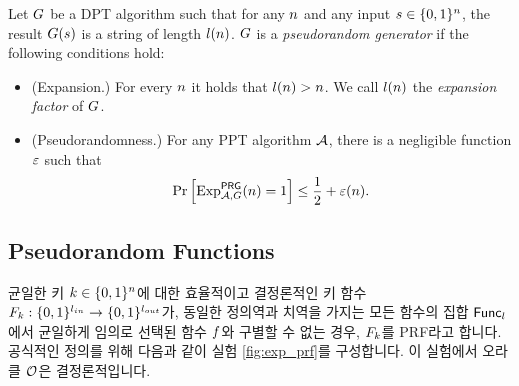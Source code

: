 \begin{definition} 
  Let $G$ be a DPT algorithm such that for any $n$ and any input $s \in
  \{0, 1\}^{n}$, the result $G(s)$ is a string of length $l(n)$. $G$ is a
  \emph{pseudorandom generator} if the following conditions hold:
  \begin{itemize}
      \item (Expansion.) For every $n$ it holds that $l(n) > n$. We call $l(n)$ the \emph{expansion factor} of $G$.
      \item (Pseudorandomness.) For any PPT algorithm $\mathcal{A}$, there is a negligible function $\varepsilon$ such that
            \begin{equation}
                \text{Pr} \left[ \text{Exp}^{\textsf{PRG}}_{\mathcal{A}, G}(n) = 1 \right] \leq \frac{1}{2} + \varepsilon(n).
            \end{equation}
  \end{itemize}
  \label{def:prg}
\end{definition}

\subsection*{Pseudorandom Functions}
균일한 키 $k \in \{0, 1\}^{n}$에 대한 효율적이고 결정론적인 키 함수 
$F_{k}: \{0, 1\}^{l_{in}} \to \{0, 1\}^{l_{out}}$가, 동일한 정의역과 치역을 가지는 모든 
함수의 집합 $\textsf{Func}_l$에서 균일하게 임의로 선택된 함수 $f$와 구별할 수 없는 경우, $F_{k}$를 
PRF라고 합니다. 공식적인 정의를 위해 다음과 같이 실험 \ref{fig:exp_prf}를 구성합니다. 이 실험에서 
오라클 $\mathcal{O}$은 결정론적입니다.

